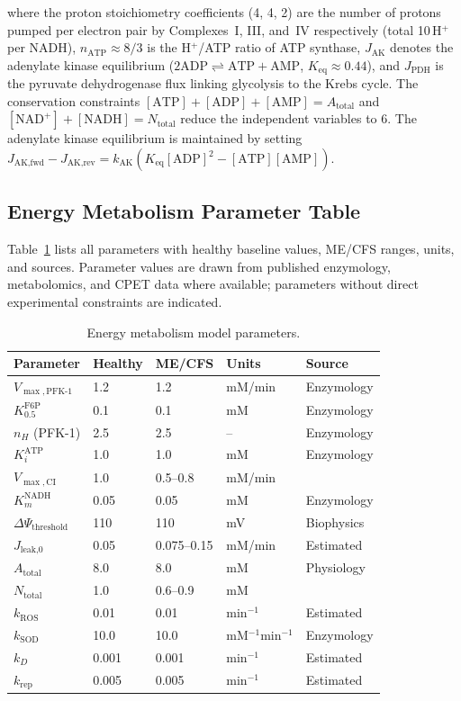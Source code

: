 where the proton stoichiometry coefficients (4, 4, 2) are the number of protons pumped per electron pair by Complexes~I, III, and~IV respectively (total 10\,H$^+$ per NADH), $n_{\text{ATP}} \approx 8/3$ is the H$^+$/ATP ratio of ATP synthase, $J_{\text{AK}}$ denotes the adenylate kinase equilibrium ($2\text{ADP} \rightleftharpoons \text{ATP} + \text{AMP}$, $K_{\text{eq}} \approx 0.44$), and $J_{\text{PDH}}$ is the pyruvate dehydrogenase flux linking glycolysis to the Krebs cycle. The conservation constraints $[\text{ATP}] + [\text{ADP}] + [\text{AMP}] = A_{\text{total}}$ and $[\text{NAD}^+] + [\text{NADH}] = N_{\text{total}}$ reduce the independent variables to 6. The adenylate kinase equilibrium is maintained by setting $J_{\text{AK,fwd}} - J_{\text{AK,rev}} = k_{\text{AK}}(K_{\text{eq}}[\text{ADP}]^2 - [\text{ATP}][\text{AMP}])$.

\subsection{Energy Metabolism Parameter Table}

Table~\ref{tab:energy-params} lists all parameters with healthy baseline values, ME/CFS ranges, units, and sources. Parameter values are drawn from published enzymology, metabolomics, and CPET data where available; parameters without direct experimental constraints are indicated.

\begin{table}[htbp]
\centering
\caption{Energy metabolism model parameters.}
\label{tab:energy-params}
\small
\begin{tabular}{llllp{3.5cm}}
\hline
\textbf{Parameter} & \textbf{Healthy} & \textbf{ME/CFS} & \textbf{Units} & \textbf{Source} \\
\hline
$V_{\max,\text{PFK-1}}$ & 1.2 & 1.2 & mM/min & Enzymology \\
$K_{0.5}^{\text{F6P}}$ & 0.1 & 0.1 & mM & Enzymology \\
$n_H$ (PFK-1) & 2.5 & 2.5 & -- & Enzymology \\
$K_i^{\text{ATP}}$ & 1.0 & 1.0 & mM & Enzymology \\
$V_{\max,\text{CI}}$ & 1.0 & 0.5--0.8 & mM/min & \cite{Tomas2017} \\
$K_m^{\text{NADH}}$ & 0.05 & 0.05 & mM & Enzymology \\
$\Delta\Psi_{\text{threshold}}$ & 110 & 110 & mV & Biophysics \\
$J_{\text{leak,0}}$ & 0.05 & 0.075--0.15 & mM/min & Estimated \\
$A_{\text{total}}$ & 8.0 & 8.0 & mM & Physiology \\
$N_{\text{total}}$ & 1.0 & 0.6--0.9 & mM & \cite{syed2025nad_therapy} \\
$k_{\text{ROS}}$ & 0.01 & 0.01 & min$^{-1}$ & Estimated \\
$k_{\text{SOD}}$ & 10.0 & 10.0 & mM$^{-1}$min$^{-1}$ & Enzymology \\
$k_D$ & 0.001 & 0.001 & min$^{-1}$ & Estimated \\
$k_{\text{rep}}$ & 0.005 & 0.005 & min$^{-1}$ & Estimated \\
\hline
\end{tabular}
\end{table}

